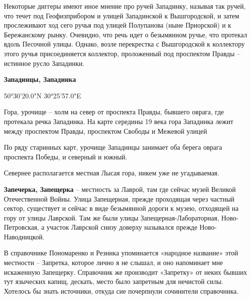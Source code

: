 Некоторые диггеры имеют иное мнение про ручей Западинку, называя так ручей, что течет под Геофизприбором и улицей Западинской к Вышгородской, и затем прослеживают ход сего ручья под улицей Полупанова (ныне Приорской) и к Бережанскому рынку. Очевидно, что речь идет о безымянном ручье, что протекал вдоль Песочной улицы. Однако, возле перекрестка с Вышгородской к коллектору этого ручья присоединяется коллектор, проложенный под проспектом Правды – истинное русло Западинки.\\

\medskip

\textbf{Западинцы, Западинка}

50°30'20.0"N 30°25'57.0"E

Гора, урочище – холм на север от проспекта Правды, бывшего оврага, где протекала речка Западинка. На карте середины 19 века гора Западинка лежит между проспектом Правды, проспектом Свободы и Межевой улицей


По ряду старинных карт, урочище Западинцы занимает оба берега оврага проспекта Победы, и северный и южный.

Севернее располагается местная Лысая гора, никем уже не угадываемая.\\

\medskip

\textbf{Запечерка, Запещерка} – местность за Лаврой, там где сейчас музей Великой Отечественной Войны. Улица Запещерная, прежде проходящая через частный сектор, существует и сейчас в виде безымянной дороги к музею, отходящей на гору от улицы Лаврской. Там же были улицы Запещерная-Лабораторная, Ново-Петровская, а участок Лаврской снизу доверху назывался прежде Ново-Наводницкой.

В справочнике Пономаренко и Резника упоминается «народное название» этой местности – Запретка, которое лично я не слышал, и оно напоминает мне искаженную Запещерку. Справочник же производит «Запретку» от неких бывших тут языческих капищ, дескать, место было запретным для нечистой силы. Хотелось бы знать источники, откуда сие почерпнули сочинители справочника.\\

